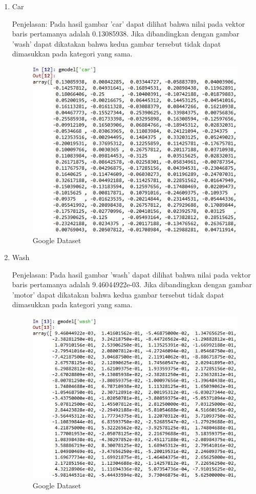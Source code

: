 \begin{enumerate}
\begin{enumerate}
\item Car

Penjelasan: Pada hasil gambar 'car' dapat dilihat bahwa nilai pada vektor baris pertamanya adalah 0.13085938. Jika dibandingkan dengan gambar 'wash' dapat dikatakan bahwa kedua gambar tersebut tidak dapat dimasukkan pada kategori yang sama.

\begin{figure}[!hbtp]
\centering
\includegraphics[scale=0.7]{figures/1174031/5/19car.jpg}
\caption{Google Dataset}
\label{Google Dataset}
\end{figure}

\item Wash

Penjelasan: Pada hasil gambar 'wash' dapat dilihat bahwa nilai pada vektor baris pertamanya adalah 9.46044922e-03. Jika dibandingkan dengan gambar 'motor' dapat dikatakan bahwa kedua gambar tersebut tidak dapat dimasukkan pada kategori yang sama.

\begin{figure}[!hbtp]
\centering
\includegraphics[scale=0.7]{figures/1174031/5/20wash.jpg}
\caption{Google Dataset}
\label{Google Dataset}
\end{figure}


\end{enumerate}
\end{enumerate}
